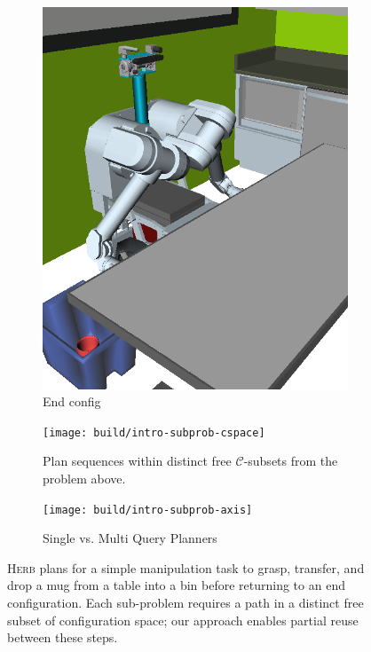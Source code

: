 {\begin{figure}
\begin{widepage}
\begin{center}
\begin{subfigure}[t]{0.19\linewidth}
\includegraphics[width=\columnwidth]{figs/testherb-e.png}
\caption{End config}
\end{subfigure}

\vspace{0.1in}

   \begin{subfigure}[b]{4.0in}
      \begin{center}
      \texttt{[image: build/intro-subprob-cspace]}
      \end{center}
      \caption{Plan sequences
         within distinct free $\mathcal{C}$-subsets
         from the problem above.}
   \end{subfigure}%
   \quad%
   \begin{subfigure}[b]{2.0in}
      \begin{center}
      \texttt{[image: build/intro-subprob-axis]}
      \end{center}
      \caption{Single vs. Multi Query Planners}
   \end{subfigure}
   \caption{\textsc{Herb} plans for a simple manipulation task
      to grasp, transfer, and drop a mug from a table into a bin
      before returning to an end configuration.
      Each sub-problem requires a path in a distinct free subset of
      configuration space;
      our approach enables partial reuse between these steps.}
   \label{fig:intro-multi-step}
\end{center}
\end{widepage}
\end{figure}
}


